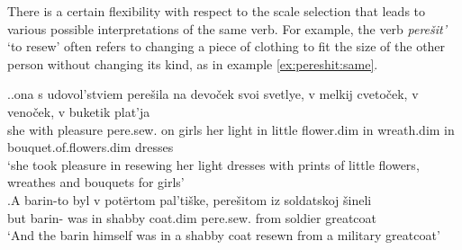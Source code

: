 %
%
%

There is a certain flexibility with respect to the scale selection that leads to various possible interpretations of the same  verb. For example, the verb \textit{pere\v{s}it'} `to resew' often refers to changing a piece of clothing to fit the size of the other person without changing its kind, as in example \ref{ex:pereshit:same}.

\ex.\label{ex:pereshit}\ag.\label{ex:pereshit:same}ona s udovol'stviem pere\v{s}ila na devo\v{c}ek svoi svetlye, v melkij cveto\v{c}ek, v veno\v{c}ek, v buketik plat'ja\\
she with pleasure pere.sew. on girls her light in little flower.dim in wreath.dim in bouquet.of.flowers.dim dresses\\
\trans `she took pleasure in resewing her light dresses with prints of little flowers, wreathes and bouquets for girls'\\
\bg.\label{ex:pereshit:other}A barin-to byl v pot\"{e}rtom pal'ti\v{s}ke, pere\v{s}itom iz soldatskoj \v{s}ineli\\
but barin- was in shabby coat.dim pere.sew. from soldier greatcoat\\
\trans `And the barin himself was in a shabby coat resewn from a military greatcoat'

